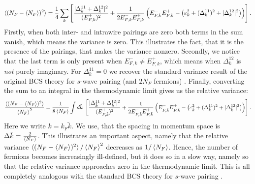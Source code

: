 \begin{equation}
\braket{(N_F - {\braket{N_F}})^2} = \frac{1}{4}\sum_k\left[ \frac{|\Delta^{11}_k + \Delta^{12}_k|^2}{(E^{+}_{F,k})^2} + \frac{1}{2E^{-}_{F,k}E^{+}_{F,k}}\left(E^{-}_{F,k}E^{+}_{F,k} - \left(\varepsilon_k^2 + (\Delta^{11}_k)^2 + |\Delta^{12}_k|^2\right) \right) \right].
\end{equation}
Firstly, when both inter- and intrawire pairings are zero both terms in the sum vanish, which means the variance is zero. This illustrates the fact, that it is the presence of the pairings, that makes the variance nonzero. Secondly, we notice that the last term is only present when $E^{-}_{F,k} \neq E^{+}_{F,k}$, which means when $\Delta^{12}_k$ is \textit{not} purely imaginary. For $\Delta^{11}_k = 0$ we recover the standard variance result of the original BCS theory for $s$-wave pairing (and $2N_F$ fermions) \cite[pp. 50-52]{Tinkham}. Finally, converting the sum to an integral in the thermodynamic limit gives us the relative variance:
\begin{equation}
\frac{\braket{(N_F - \braket{N_F})^2}}{\braket{N_F}^2} = \frac{1}{8\braket{N_F}}\int d\tilde{k} \; \left[ \frac{|\Delta^{11}_{\tilde{k}} + \Delta^{12}_{\tilde{k}}|^2}{(E^{+}_{F,\tilde{k}})^2} + \frac{1}{2E^{-}_{F,\tilde{k}}E^{+}_{F,\tilde{k}}}\left(E^{-}_{F,\tilde{k}}E^{+}_{F,\tilde{k}} - \left(\varepsilon_{\tilde{k}}^2 + (\Delta^{11}_{\tilde{k}})^2 + |\Delta^{12}_{\tilde{k}}|^2\right) \right) \right]. \nonumber
\end{equation}
Here we write $k = k_F \tilde{k}$. We use, that the spacing in momentum space is $\Delta \tilde{k} = \frac{2}{\braket{N_F}}$. This illustrates an important aspect, namely that the relative variance $\braket{(N_F - \braket{N_F})^2}/\braket{N_F}^2$ decreases as $1/\braket{N_F}$. Hence, the number of fermions becomes increasingly ill-defined, but it does so in a slow way, namely so that the relative variance approaches zero in the thermodynamic limit. This is all completely analogous with the standard BCS theory for $s$-wave pairing \cite[pp. 50-52]{Tinkham}. 


